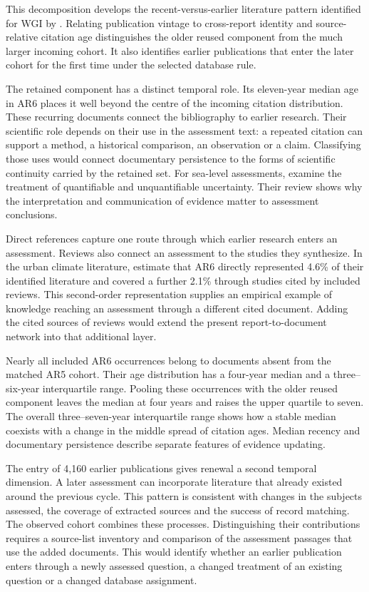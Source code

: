 \documentclass[11pt,a4paper]{article}
\begin{document}
This decomposition develops the recent-versus-earlier literature pattern identified for WGI by \citet{huang2023ar5ar6}. Relating publication vintage to cross-report identity and source-relative citation age distinguishes the older reused component from the much larger incoming cohort. It also identifies earlier publications that enter the later cohort for the first time under the selected database rule.

The retained component has a distinct temporal role. Its eleven-year median age in AR6 places it well beyond the centre of the incoming citation distribution. These recurring documents connect the bibliography to earlier research. Their scientific role depends on their use in the assessment text: a repeated citation can support a method, a historical comparison, an observation or a claim. Classifying those uses would connect documentary persistence to the forms of scientific continuity carried by the retained set. For sea-level assessments, \citet{kopp2023uncertainty} examine the treatment of quantifiable and unquantifiable uncertainty. Their review shows why the interpretation and communication of evidence matter to assessment conclusions.

Direct references capture one route through which earlier research enters an assessment. Reviews also connect an assessment to the studies they synthesize. In the urban climate literature, \citet{montfort2025urban} estimate that AR6 directly represented 4.6\% of their identified literature and covered a further 2.1\% through studies cited by included reviews. This second-order representation supplies an empirical example of knowledge reaching an assessment through a different cited document. Adding the cited sources of reviews would extend the present report-to-document network into that additional layer.

Nearly all included AR6 occurrences belong to documents absent from the matched AR5 cohort. Their age distribution has a four-year median and a three--six-year interquartile range. Pooling these occurrences with the older reused component leaves the median at four years and raises the upper quartile to seven. The overall three--seven-year interquartile range shows how a stable median coexists with a change in the middle spread of citation ages. Median recency and documentary persistence describe separate features of evidence updating.

The entry of 4,160 earlier publications gives renewal a second temporal dimension. A later assessment can incorporate literature that already existed around the previous cycle. This pattern is consistent with changes in the subjects assessed, the coverage of extracted sources and the success of record matching. The observed cohort combines these processes. Distinguishing their contributions requires a source-list inventory and comparison of the assessment passages that use the added documents. This would identify whether an earlier publication enters through a newly assessed question, a changed treatment of an existing question or a changed database assignment.
\end{document}

